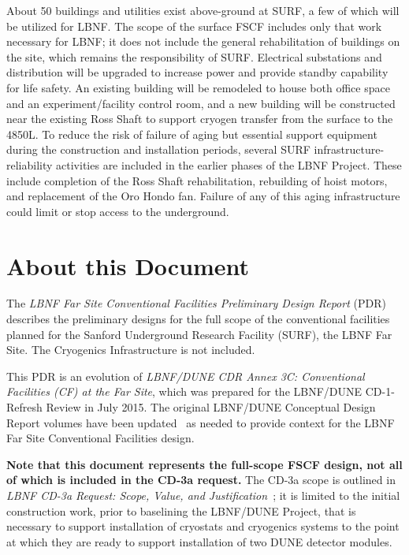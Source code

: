 About 50 buildings and utilities exist above-ground at SURF, a few of which will be utilized for LBNF. 
The scope of the surface FSCF includes only that work necessary for LBNF; it does not include the general rehabilitation of buildings on the site, which remains the responsibility of SURF. Electrical substations and distribution will be upgraded to increase power and provide standby capability for life safety. %
An existing building will be remodeled to house both office space and an experiment/facility control room, and a new building will be constructed near the existing Ross Shaft to support cryogen transfer from the surface to the 4850L. To reduce the risk of failure of aging but essential support equipment during the construction and installation periods, several SURF infrastructure-reliability activities are included in the earlier phases %
of the LBNF Project. These include completion of the Ross Shaft rehabilitation, rebuilding of hoist motors, and replacement of the Oro Hondo fan. Failure of any of this aging infrastructure could limit or stop access to the underground.


\section{About this Document}
\label{sec:pdr-org-fscf}

The \textit{LBNF Far Site Conventional Facilities Preliminary Design Report} (PDR) describes the preliminary designs for the full scope of the conventional facilities planned for the Sanford Underground Research Facility (SURF), the LBNF Far Site. The Cryogenics Infrastructure is not included. 

This PDR is an evolution of \textit{LBNF/DUNE CDR Annex 3C: Conventional Facilities (CF) at the Far Site}, which was prepared for the LBNF/DUNE CD-1-Refresh Review in July 2015. 
The original LBNF/DUNE Conceptual Design Report volumes have been updated~\cite{design-doc-lbnf-dune, design-doc-dune-physics, design-doc-lbnf, design-doc-dune-det}  as needed to provide context for the LBNF Far Site Conventional Facilities design.


\textbf{Note that this document represents the full-scope FSCF design, not all of which is included in the CD-3a request.} The CD-3a scope is outlined in \textit{LBNF CD-3a Request: Scope, Value, and Justification}~\cite{cd3a-request-scope-227}; it is limited to the initial construction work, prior to baselining the LBNF/DUNE Project, that is necessary to
support installation of cryostats and cryogenics systems to the point at which they are ready to support installation of two DUNE detector modules. 


